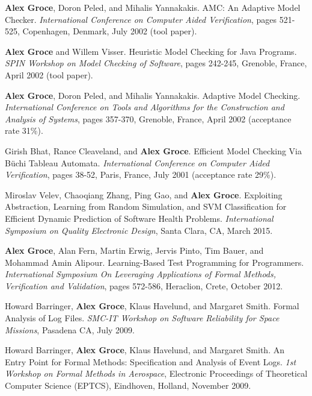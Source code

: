 \documentclass[ComputerScience]{vita}
\begin{document}
\begin{vita}
\begin{Refereed Conference and Workshop Publications}
\item
{\bf Alex Groce}, Doron Peled, and Mihalis Yannakakis.
\newblock AMC: An Adaptive Model Checker.
\newblock \emph{International Conference on Computer Aided Verification}, pages 521-525, Copenhagen, Denmark, July 2002 (tool paper).

\item
{\bf Alex Groce} and Willem Visser.
\newblock Heuristic Model Checking for Java Programs.
\newblock \emph{SPIN Workshop on Model Checking of Software}, pages 242-245, Grenoble, France, April 2002 (tool paper).

\item
{\bf Alex Groce}, Doron Peled, and Mihalis Yannakakis.
\newblock Adaptive Model Checking.
\newblock \emph{International Conference on Tools and Algorithms for the Construction and Analysis of Systems}, pages 357-370, Grenoble, France, April 2002 (acceptance rate 31\%).

\item
Girish Bhat, Rance Cleaveland, and {\bf Alex Groce}.
\newblock Efficient Model Checking Via B\"uchi Tableau Automata.
\newblock \emph{International Conference on Computer Aided Verification}, pages 38-52, Paris, France, July 2001 (acceptance rate 29\%).
\end{Refereed Conference and Workshop Publications}

\begin{Invited Papers}
\item Miroslav Velev, Chaoqiang Zhang, Ping Gao, and {\bf Alex Groce}.
\newblock Exploiting Abstraction, Learning from Random Simulation, and SVM Classification for Efficient Dynamic Prediction of Software Health Problems.
\newblock \emph{International Symposium on Quality Electronic Design}, Santa Clara, CA, March 2015.

\item {\bf Alex Groce}, Alan Fern, Martin Erwig, Jervis Pinto, Tim Bauer, and Mohammad Amin Alipour.
\newblock Learning-Based Test Programming for Programmers.
\newblock \emph{International Symposium On Leveraging Applications of Formal Methods, Verification and Validation}, pages 572-586, Heraclion, Crete, October 2012.


\item Howard Barringer, {\bf Alex Groce}, Klaus Havelund, and Margaret Smith.
\newblock Formal Analysis of Log Files.
\newblock \emph{SMC-IT Workshop on Software Reliability for Space Missions}, Pasadena CA, July 2009.


\item Howard Barringer, {\bf Alex Groce}, Klaus Havelund, and Margaret Smith.
\newblock An Entry Point for Formal Methods:  Specification and Analysis of Event Logs.
\newblock \emph{1st Workshop on Formal Methods in Aerospace}, Electronic Proceedings of Theoretical Computer Science (EPTCS), Eindhoven, Holland, November 2009.


\end{Invited Papers}
\end{vita}
\end{document}
